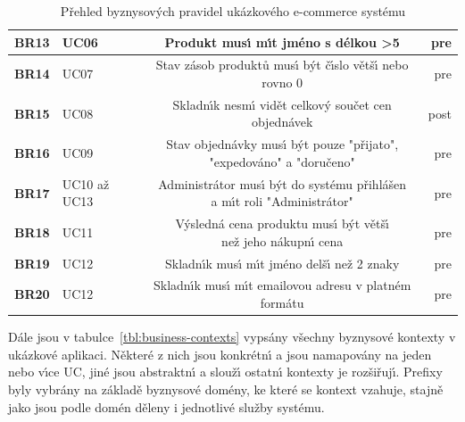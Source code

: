 \begin{table}
\begin{tabular}{ l l c r }
        \textbf{BR13} & UC06 & Produkt mus\'{\i} m\'{\i}t jméno s délkou >5 & pre \\ \hline
        \textbf{BR14} & UC07 & Stav zásob produktů mus\'{\i} b\'yt č\'{\i}slo větš\'{\i} nebo rovno 0 & pre \\ \hline
        \textbf{BR15} & UC08 & Skladn\'{\i}k nesm\'{\i} vidět celkov\'y součet cen objednávek & post \\ \hline
        \textbf{BR16} & UC09 & \makecell[c]{Stav objednávky mus\'{\i} b\'yt pouze "přijato", \\ "expedováno" a "doručeno"} & pre \\ \hline
        \textbf{BR17} & UC10 až UC13 & \makecell[c]{Administrátor mus\'{\i} b\'yt do systému přihlášen \\ a m\'{\i}t roli "Administrátor"} & pre \\ \hline
        \textbf{BR18} & UC11 & \makecell[c]{V\'ysledná cena produktu mus\'{\i} b\'yt větš\'{\i} \\ než jeho nákupn\'{\i} cena} & pre \\ \hline
        \textbf{BR19} & UC12 & Skladn\'{\i}k mus\'{\i} m\'{\i}t jméno delš\'{\i} než 2 znaky & pre \\ \hline
        \textbf{BR20} & UC12 & Skladn\'{\i}k mus\'{\i} m\'{\i}t emailovou adresu v platném formátu & pre \\
        \hline
    \end{tabular}
    \caption{Přehled byznysov\'ych pravidel ukázkového e-commerce systému}
    \label{tbl:business-rules}
\end{table}

Dále jsou v tabulce~\ref{tbl:business-contexts} vypsány všechny byznysové kontexty v ukázkové aplikaci.
Některé z nich jsou konkrétn\'{\i} a jsou namapovány na jeden nebo v\'{\i}ce \gls{UC},
jiné jsou abstraktn\'{\i} a slouž\'{\i} ostatn\'{\i} kontexty je rozšiřuj\'{\i}.
Prefixy byly vybrány na základě byznysové domény, ke které se kontext vzahuje, stajně jako
jsou podle domén děleny i jednotlivé služby systému.

